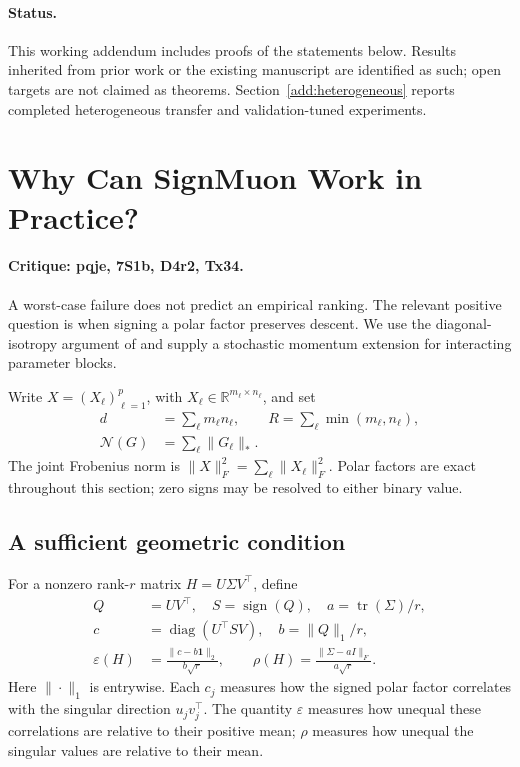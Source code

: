 \begin{abstract}
We organize the theory revision around the reviewers' questions. We give a
geometric sufficient condition for vanilla SignMuon, extend it to stochastic
EMA and Nesterov momentum, and give convex quadratic EF21-SignMuon
counterexamples under decreasing steps and finite-budget tuning.
Further extensions are explicitly marked as open targets.
\end{abstract}

\paragraph{Status.}
This working addendum includes proofs of the statements below. Results
inherited from prior work or the existing manuscript are identified as such;
open targets are not claimed as theorems. Section~\ref{add:heterogeneous}
reports completed heterogeneous transfer and validation-tuned experiments.

\section{Why Can SignMuon Work in Practice?}
\label{add:geometry}
\paragraph{Critique: pqje, 7S1b, D4r2, Tx34.}
A worst-case failure does not predict an empirical ranking. The relevant
positive question is when signing a polar factor preserves descent. We use
the diagonal-isotropy argument of \citet{wang2026olion} and supply a stochastic
momentum extension for interacting parameter blocks.

Write $X=(X_\ell)_{\ell=1}^p$, with
$X_\ell\in\mathbb R^{m_\ell\times n_\ell}$, and set
\begin{align*}
 d&=\sum_\ell m_\ell n_\ell,\qquad
 R=\sum_\ell\min(m_\ell,n_\ell),\\
 \mathcal N(G)&=\sum_\ell\|G_\ell\|_*.
\end{align*}
The joint Frobenius norm is
$\|X\|_F^2=\sum_\ell\|X_\ell\|_F^2$.
Polar factors are exact throughout this section; zero signs may be resolved
to either binary value.

\subsection{A sufficient geometric condition}
For a nonzero rank-$r$ matrix $H=U\Sigma V^\top$, define
\begin{align*}
 Q&=UV^\top,\quad S=\operatorname{sign}(Q),\quad
 a=\operatorname{tr}(\Sigma)/r,\\
 c&=\operatorname{diag}(U^\top SV),\quad b=\|Q\|_1/r,\\
 \varepsilon(H)&=\frac{\|c-b\mathbf1\|_2}{b\sqrt r},\qquad
 \rho(H)=\frac{\|\Sigma-aI\|_F}{a\sqrt r}.
\end{align*}
Here $\|\cdot\|_1$ is entrywise. Each $c_j$ measures how the signed polar
factor correlates with the singular direction $u_jv_j^\top$.
The quantity $\varepsilon$ measures how unequal these correlations are
relative to their positive mean; $\rho$ measures how unequal the singular
values are relative to their mean.

